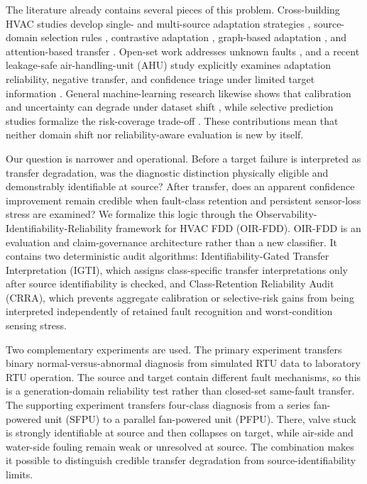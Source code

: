 \documentclass[preprint,12pt]{elsarticle}
\begin{document}
The literature already contains several pieces of this problem. Cross-building HVAC studies develop single- and multi-source adaptation strategies \cite{lei2025}, source-domain selection rules \cite{zhang2025source}, contrastive adaptation \cite{ghalamsiah2025can}, graph-based adaptation \cite{ghalamsiah2026graph}, and attention-based transfer \cite{wang2026cross}. Open-set work addresses unknown faults \cite{gao2026open}, and a recent leakage-safe air-handling-unit (AHU) study explicitly examines adaptation reliability, negative transfer, and confidence triage under limited target information \cite{jiang2026leakage}. General machine-learning research likewise shows that calibration and uncertainty can degrade under dataset shift \cite{guo2017calibration,ovadia2019uncertainty}, while selective prediction studies formalize the risk-coverage trade-off \cite{geifman2017selective,geifman2019selectivenet}. These contributions mean that neither domain shift nor reliability-aware evaluation is new by itself.

Our question is narrower and operational. Before a target failure is interpreted as transfer degradation, was the diagnostic distinction physically eligible and demonstrably identifiable at source? After transfer, does an apparent confidence improvement remain credible when fault-class retention and persistent sensor-loss stress are examined? We formalize this logic through the Observability-Identifiability-Reliability framework for HVAC FDD (OIR-FDD). OIR-FDD is an evaluation and claim-governance architecture rather than a new classifier. It contains two deterministic audit algorithms: Identifiability-Gated Transfer Interpretation (IGTI), which assigns class-specific transfer interpretations only after source identifiability is checked, and Class-Retention Reliability Audit (CRRA), which prevents aggregate calibration or selective-risk gains from being interpreted independently of retained fault recognition and worst-condition sensing stress.

Two complementary experiments are used. The primary experiment transfers binary normal-versus-abnormal diagnosis from simulated RTU data to laboratory RTU operation. The source and target contain different fault mechanisms, so this is a generation-domain reliability test rather than closed-set same-fault transfer. The supporting experiment transfers four-class diagnosis from a series fan-powered unit (SFPU) to a parallel fan-powered unit (PFPU). There, valve stuck is strongly identifiable at source and then collapses on target, while air-side and water-side fouling remain weak or unresolved at source. The combination makes it possible to distinguish credible transfer degradation from source-identifiability limits.
\end{document}
